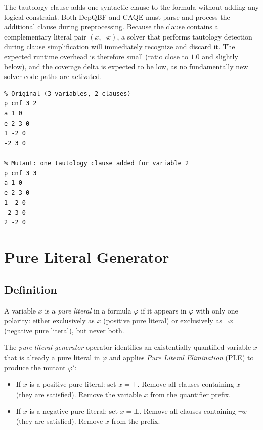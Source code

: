 The tautology clause adds one syntactic clause to the formula without adding any logical constraint. 
Both DepQBF and CAQE must parse and process the additional clause during preprocessing. 
Because the clause contains a complementary literal pair $(x, \lnot x)$, a solver that performs tautology detection during clause simplification will immediately recognize and discard it. 
The expected runtime overhead is therefore small (ratio close to $1.0$ and slightly below), and the coverage delta is expected to be low, as no fundamentally new solver code paths are activated.

\begin{listing}[H]
\caption{Tautology insertion example.}
\label{lst:tautology}
\begin{verbatim}
% Original (3 variables, 2 clauses)
p cnf 3 2
a 1 0
e 2 3 0
1 -2 0
-2 3 0

% Mutant: one tautology clause added for variable 2
p cnf 3 3
a 1 0
e 2 3 0
1 -2 0
-2 3 0
2 -2 0
\end{verbatim}
\end{listing}

\section{Pure Literal Generator}\label{sec:pureliteral}

\subsection{Definition}

A variable $x$ is a \emph{pure literal} in a formula $\varphi$ if it appears in $\varphi$ with only one polarity: either exclusively as $x$ (positive pure literal) or exclusively as $\lnot x$ (negative pure literal), but never both.

The \emph{pure literal generator} operator identifies an existentially quantified variable $x$ that is already a pure literal in $\varphi$ and applies \emph{Pure Literal Elimination} (PLE) to produce the mutant $\varphi'$:

\begin{itemize}
  \item If $x$ is a positive pure literal: set $x = \top$. Remove all clauses containing $x$ (they are satisfied). Remove the variable $x$ from the quantifier prefix.
  \item If $x$ is a negative pure literal: set $x = \bot$. Remove all clauses containing $\lnot x$ (they are satisfied). Remove $x$ from the prefix.
\end{itemize}

